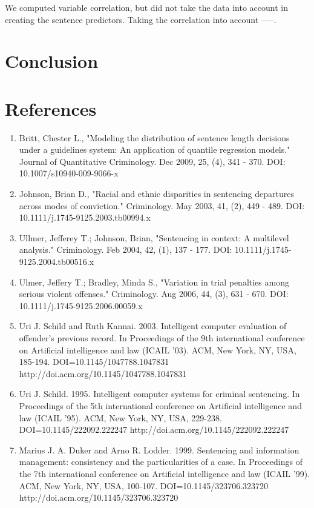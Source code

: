 \documentclass[11pt,letter]{article}
\begin{document}
We computed variable correlation, but did not take the data into account in creating the sentence predictors. Taking the correlation into account -----.

\section{Conclusion}

\section{References}
\begin{enumerate}
\item Britt, Chester L., "Modeling the distribution of sentence length decisions under a guidelines system: An application of quantile regression models." Journal of Quantitative Criminology. Dec 2009, 25, (4), 341 - 370. DOI: 10.1007/s10940-009-9066-x
\item Johnson, Brian D., "Racial and ethnic disparities in sentencing departures across modes of conviction." Criminology. May 2003, 41, (2), 449 - 489. DOI: 10.1111/j.1745-9125.2003.tb00994.x
\item Ullmer, Jefferey T.; Johnson, Brian, "Sentencing in context: A multilevel analysis." Criminology. Feb 2004, 42, (1), 137 - 177. DOI: 10.1111/j.1745-9125.2004.tb00516.x
\item Ulmer, Jeffery T.; Bradley, Minda S., "Variation in trial penalties among serious violent offenses." Criminology. Aug 2006, 44, (3), 631 - 670. DOI: 10.1111/j.1745-9125.2006.00059.x
\item Uri J. Schild and Ruth Kannai. 2003. Intelligent computer evaluation of offender's previous record. In Proceedings of the 9th international conference on Artificial intelligence and law (ICAIL '03). ACM, New York, NY, USA, 185-194. DOI=10.1145/1047788.1047831 http://doi.acm.org/10.1145/1047788.1047831
\item Uri J. Schild. 1995. Intelligent computer systems for criminal sentencing. In Proceedings of the 5th international conference on Artificial intelligence and law (ICAIL '95). ACM, New York, NY, USA, 229-238. DOI=10.1145/222092.222247 http://doi.acm.org/10.1145/222092.222247
\item Marius J. A. Duker and Arno R. Lodder. 1999. Sentencing and information management: consistency and the particularities of a case. In Proceedings of the 7th international conference on Artificial intelligence and law (ICAIL '99). ACM, New York, NY, USA, 100-107. DOI=10.1145/323706.323720 http://doi.acm.org/10.1145/323706.323720
\end{enumerate}
\end{document}
